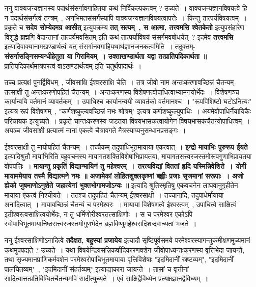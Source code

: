 	ननु वाक्यजन्यज्ञानस्य पदार्थसंसर्गावगाहितया कथं निर्विकल्पकत्वम् ? उच्यते~। वाक्यजन्यज्ञानविषयत्वे हि न पदार्थसंसर्गत्वं तन्त्रम्~, अनभिमतसंसर्गस्यापि वाक्यजन्यज्ञानविषयत्वापत्तेः~। किन्तु तात्पर्यविषयत्वम्~। प्रकृते च {\bfseries सदेव सोम्येदमग्र आसीत्} इत्युपक्रम्य {\bfseries तत् सत्यम्~, स आत्मा, तत्त्वमसि श्वेतकेतो} इत्युपसंहारेण विशुद्धे ब्रह्मणि वेदान्तानां तात्पर्यमवसितम् इति कथं तात्पर्याविषयं संसर्गमवबोधयेत्~? इदमेव {\bfseries तत्त्वमसि} इत्यादिवाक्यानामखण्डार्थत्वं यत् संसर्गानवगाहियथार्थज्ञानजनकत्वमिति~। तदुक्तम्- {\bfseries संसर्गासङ्गिसम्यग्धीहेतुता या गिरामियम्~। उक्ताखण्डार्थता यद्वा तत्प्रातिपदिकार्थता ॥} प्रातिपदिकार्थमात्रपरत्वं वाऽखण्डार्थत्वम् इति चतुर्थपादार्थः~।\par
	तच्च प्रत्यक्षं पुनर्द्विविधम्~, जीवसाक्षि ईश्वरसाक्षि चेति~। तत्र जीवो नाम अन्तःकरणावच्छिन्नं चैतन्यम् तत्साक्षी तु अन्तःकरणोपहितं चैतन्यम्~। अन्तःकरणस्य विशेषणत्वोपाधित्वाभ्यामनयोर्भेदः~। विशेषणञ्च कार्यान्वयि वर्तमानं व्यावर्तकम्~। उपाधिश्च कार्यानन्वयी व्यावर्तको वर्तमानश्च~। "रूपविशिष्टो घटोऽनित्यः" इत्यत्र रूपं विशेषणम्~, "कर्णशष्कुल्यवच्छिन्नं नभः श्रोत्रम्" इत्यत्र कर्णशष्कुल्युपाधिः~। अयमेवोपाधिर्नैयायिकैः परिचायक इत्युच्यते~। प्रकृते चान्तःकरणस्य जडतया विषयभासकत्वायोगेन विषयभासकचैतन्योपाधित्वम्~। अयञ्च जीवसाक्षी प्रत्यात्मं नाना एकत्वे चैत्रावगते मैत्रस्याप्यनुसन्धानप्रसङ्गः~। \par
	ईश्वरसाक्षी तु मायोपहितं चैतन्यम्~। तच्चैकम् तदुपाधिभूतमायाया एकत्वात्~। {\bfseries इन्द्रो मायाभिः पुरुरूप ईयते} इत्यादिश्रुतौ मायाभिरिति बहुवचनस्य मायागतशक्तिविशेषाभिप्रायतया, मायागतसत्त्वरजस्तमोरूपगुणाभिप्रायतया वोपपत्तिः~। {\bfseries मायान्तु प्रकृतिं विद्यान्मायिनं तु महेश्वरम्~। तरत्यविद्यां विततां हृदि यस्मिन्निवेशिते~। योगी मायाममेयाय तस्मै विद्यात्मने नमः ॥ अजामेकां लोहितशुक्लकृष्णां बह्वीः प्रजाः सृजमानां सरूपाः~। अजो ह्येको जुषमाणोऽनुशेते जहात्येनां भुक्तभोगामजोऽन्यः ॥} इत्यादि श्रुतिस्मृतिषु एकवचनेन लाघवानुगृहीतेन मायाया एकत्वं निश्चीयते~। ततश्च तदुपहितं चैतन्यम् ईश्वरसाक्षी~। तच्चानादि, तदुपाधेर्मायाया अनादित्वात्~। मायावच्छिन्नं चैतन्यं च परमेश्वरः~। मायाया विशेषणत्वे ईश्वरत्वम्~, उपाधित्वे साक्षित्वं इतीश्वरत्वसाक्षित्वयोर्भेदः, न तु धर्मिणोरीश्वरतत्साक्षिणोः~। स च परमेश्वर एकोऽपि स्वोपाधिभूतमायानिष्ठसत्त्वरजस्तमोगुणभेदेन ब्रह्मविष्णुमहेश्वरादिशब्दवाच्यतां भजते~। \par
	ननु ईश्वरसाक्षिणोऽनादित्वे {\bfseries तदैक्षत, बहुस्यां प्रजायेय} इत्यादौ सृष्टिपूर्वसमये परमेश्वरस्यागन्तुकमीक्षणमुच्यमानं कथमुपपद्यते ? उच्यते~। यथा विषयेन्द्रियसन्निकर्षादिकारणवशेन जीवोपाध्यन्तःकरणस्य वृत्तिभेदा जायन्ते, तथा सृज्यमानप्राणिकर्मवशेन परमेश्वरोपाधिभूतमायाया वृत्तिविशेषाः "इदमिदानीं स्रष्टव्यम्", "इदमिदानीं पालयितव्यम्"~, "इदमिदानीं संहर्तव्यम्" इत्याद्याकारा जायन्ते~। तासां च वृत्तीनां सादित्वात्तत्प्रतिबिम्बितचैतन्यमपि सादीत्युच्यते~। एवं साक्षिद्वैविध्येन प्रत्यक्षज्ञानद्वैविध्यम्~। \par
